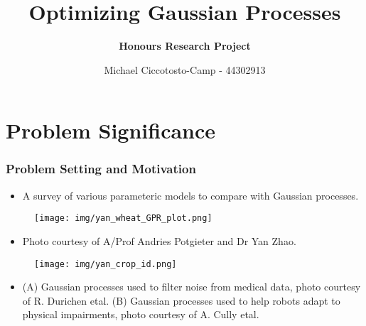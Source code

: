 \documentclass[9pt,hyperref={pdfpagelabels=false},xcolor=table]{beamer}
\title{Optimizing Gaussian Processes}
\author[Michael Ciccotosto-Camp]{{\bf Honours Research Project}}
\date{
Michael Ciccotosto-Camp - 44302913 \\
}
\begin{document}
\maketitle

\section{Problem Significance}

\begin{frame}
    \frametitle{Problem Setting and Motivation}
    \begin{itemize}
        \item A survey of various parameteric models to compare with Gaussian processes.
    \end{itemize}
    \begin{figure}
        \centering
        \texttt{[image: img/yan\_wheat\_GPR\_plot.png]}
    \end{figure}
\end{frame}

\begin{frame}
    \begin{itemize}
        \item Photo courtesy of A/Prof Andries Potgieter and Dr Yan Zhao.
    \end{itemize}
    \begin{figure}
        \centering
        \texttt{[image: img/yan\_crop\_id.png]}
    \end{figure}
\end{frame}

\begin{frame}
    \begin{figure}
        \centering
    \end{figure}
    \begin{itemize}
        \item (A) Gaussian processes used to filter noise from medical data, photo courtesy of R. Durichen etal. (B) Gaussian processes used to help robots adapt to physical impairments, photo courtesy of A. Cully etal.
    \end{itemize}
\end{frame}
\end{document}
